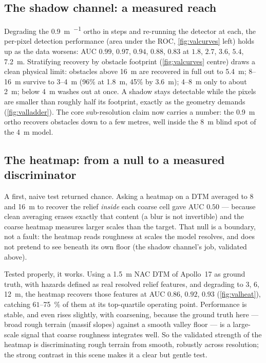 \documentclass[11pt]{article}
\begin{document}
\subsection{The shadow channel: a measured reach}
Degrading the \SI{0.9}{\meter\per\px} ortho in steps and re-running the detector at each,
the per-pixel detection performance (area under the ROC, \cref{fig:valcurves} left) holds
up as the data worsens: AUC $0.99$, $0.97$, $0.94$, $0.88$, $0.83$ at $1.8$, $2.7$, $3.6$,
$5.4$, \SI{7.2}{m}. Stratifying recovery by obstacle footprint (\cref{fig:valcurves}
centre) draws a clean physical limit: obstacles above \SI{16}{m} are recovered in full
out to \SI{5.4}{m}; \SI{8}{}--\SI{16}{m} survive to \SI{3}{}--\SI{4}{m} (96\% at
\SI{1.8}{m}, 45\% by \SI{3.6}{m}); \SI{4}{}--\SI{8}{m} only to about \SI{2}{m}; below
\SI{4}{m} washes out at once. A shadow stays detectable while the pixels are smaller than
roughly half its footprint, exactly as the geometry demands (\cref{fig:valladder}). The
core sub-resolution claim now carries a number: the \SI{0.9}{m} ortho recovers obstacles
down to a few metres, well inside the \SI{8}{m} blind spot of the \SI{4}{m} model.

\subsection{The heatmap: from a null to a measured discriminator}
A first, naive test returned chance. Asking a heatmap on a DTM averaged to \SI{8}{} and
\SI{16}{m} to recover the relief \emph{inside} each coarse cell gave AUC $0.50$ --- because
clean averaging erases exactly that content (a blur is not invertible) and the coarse
heatmap measures larger scales than the target. That null is a boundary, not a fault: the
heatmap reads roughness at scales the model resolves, and does not pretend to see beneath
its own floor (the shadow channel's job, validated above).

Tested properly, it works. Using a \SI{1.5}{\meter} NAC DTM of Apollo~17 as ground truth,
with hazards defined as real resolved relief features, and degrading to $3$, $6$,
\SI{12}{m}, the heatmap recovers those features at AUC $0.86$, $0.92$, $0.93$
(\cref{fig:valheat}), catching $61$--\SI{75}{\percent} of them at its top-quartile
operating point. Performance is stable, and even rises slightly, with coarsening, because
the ground truth here --- broad rough terrain (massif slopes) against a smooth valley
floor --- is a large-scale signal that coarse roughness integrates well. So the validated
strength of the heatmap is discriminating rough terrain from smooth, robustly across
resolution; the strong contrast in this scene makes it a clear but gentle test.
\end{document}
